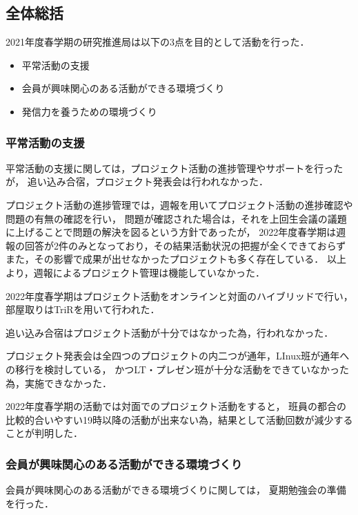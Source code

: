 \subsection*{全体総括}


2021年度春学期の研究推進局は以下の3点を目的として活動を行った．

\begin{itemize}
    \item 平常活動の支援
    \item 会員が興味関心のある活動ができる環境づくり
    \item 発信力を養うための環境づくり
\end{itemize}

\subsubsection*{平常活動の支援}
平常活動の支援に関しては，プロジェクト活動の進捗管理やサポートを行ったが，
追い込み合宿，プロジェクト発表会は行われなかった．

プロジェクト活動の進捗管理では，週報を用いてプロジェクト活動の進捗確認や問題の有無の確認を行い，
問題が確認された場合は，それを上回生会議の議題に上げることで問題の解決を図るという方針であったが，
2022年度春学期は週報の回答が2件のみとなっており，その結果活動状況の把握が全くできておらず
また，その影響で成果が出せなかったプロジェクトも多く存在している．
以上より，週報によるプロジェクト管理は機能していなかった．

2022年度春学期はプロジェクト活動をオンラインと対面のハイブリッドで行い，
部屋取りはTriRを用いて行われた．

追い込み合宿はプロジェクト活動が十分ではなかった為，行われなかった．

プロジェクト発表会は全四つのプロジェクトの内二つが通年，LInux班が通年への移行を検討している，
かつLT・プレゼン班が十分な活動をできていなかった為，実施できなかった．

2022年度春学期の活動では対面でのプロジェクト活動をすると，
班員の都合の比較的合いやすい19時以降の活動が出来ない為，結果として活動回数が減少することが判明した．

\subsubsection*{会員が興味関心のある活動ができる環境づくり}
会員が興味関心のある活動ができる環境づくりに関しては，
夏期勉強会の準備を行った．

